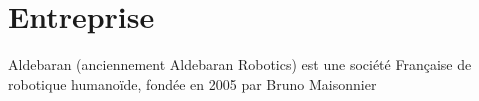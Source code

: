\chapter*{Entreprise}
\thispagestyle{fancy}

Aldebaran (anciennement Aldebaran Robotics) est une société Française de robotique humanoïde, fondée en 2005 par Bruno Maisonnier